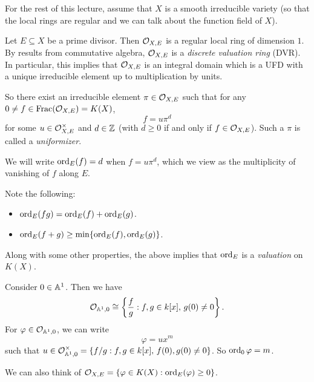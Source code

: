\begin{remark}
  For the rest of this
  lecture, assume that $X$ is a smooth
  irreducible variety (so that the local
  rings are regular and we can talk about
  the function field of $X$).
\end{remark}

\begin{remark}
  Let $E \subseteq X$ be a prime divisor.
  Then $\mathcal{O}_{X, E}$ is a regular local ring
  of dimension $1$. By results from
  commutative algebra,
  $\mathcal{O}_{X, E}$ is a
  \emph{discrete valuation ring} (DVR).
  In particular, this implies that
  $\mathcal{O}_{X, E}$ is an integral domain
  which is a UFD with a unique irreducible
  element up to multiplication by units.

  So there exist an irreducible
  element $\pi \in \mathcal{O}_{X, E}$ such that
  for any $0 \ne f \in \operatorname{Frac}(\mathcal{O}_{X, E}) = K(X)$,
  \[
    f = u \pi^d
  \]
  for some $u \in \mathcal{O}_{X, E}^\times$ and
  $d \in \mathbb{Z}$ (with $d \ge 0$ if and only if
  $f \in \mathcal{O}_{X, E}$).
  Such a $\pi$ is called a \emph{uniformizer}.

  We will write $\operatorname{ord}_E(f) = d$ when
  $f = u \pi^d$, which we view as the
  multiplicity of vanishing of $f$ along $E$.
\end{remark}

\begin{remark}
  Note the following:
  \begin{itemize}
    \item $\operatorname{ord}_E(fg) = \operatorname{ord}_E(f) + \operatorname{ord}_E(g)$.
    \item $\operatorname{ord}_E(f + g) \ge \min\{\operatorname{ord}_E(f), \operatorname{ord}_E(g)\}$.
  \end{itemize}
  Along with some other properties,
  the above implies that $\operatorname{ord}_E$ is a
  \emph{valuation} on $K(X)$.
\end{remark}

\begin{example}
  Consider $0 \in \mathbb{A}^1$. Then we have
  \[
    \mathcal{O}_{\mathbb{A}^1, 0}
    \cong \left\{\frac{f}{g} : f, g \in k[x],\, g(0) \ne 0\right\}.
  \]
  For $\varphi \in \mathcal{O}_{\mathbb{A}^1, 0}$,
  we can write
  \[
    \varphi = u x^m
  \]
  such that $u \in \mathcal{O}_{\mathbb{A}^1, 0}^\times = \{f / g : f, g \in k[x],\, f(0), g(0)  \ne 0\}$.
  So $\operatorname{ord}_0 \varphi = m$.
\end{example}

\begin{remark}
  We can also think of
  $\mathcal{O}_{X, E}
    = \{\varphi \in K(X) : \operatorname{ord}_E(\varphi) \ge 0 \}$.
\end{remark}

